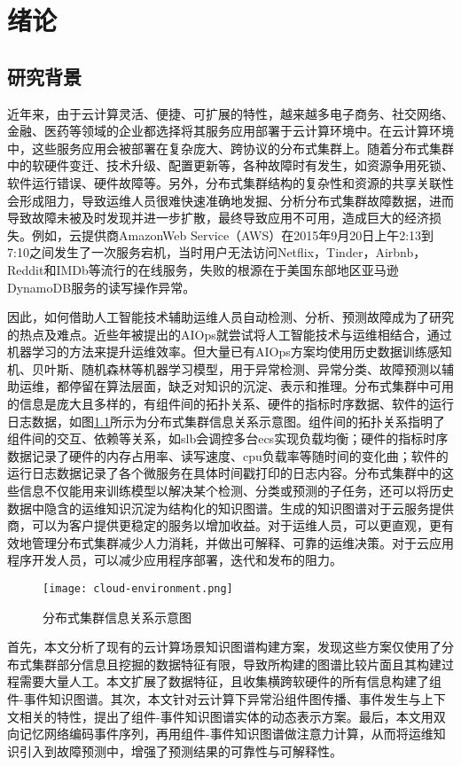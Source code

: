 \chapter{绪论}
\section{研究背景}
近年来，由于云计算灵活、便捷、可扩展的特性，越来越多电子商务、社交网络、金融、医药等领域的企业都选择将其服务应用部署于云计算环境中。在云计算环境中，这些服务应用会被部署在复杂庞大、跨协议的分布式集群上。随着分布式集群中的软硬件变迁、技术升级、配置更新等，各种故障时有发生，如资源争用死锁、软件运行错误、硬件故障等。另外，分布式集群结构的复杂性和资源的共享关联性会形成阻力，导致运维人员很难快速准确地发掘、分析分布式集群故障数据，进而导致故障未被及时发现并进一步扩散，最终导致应用不可用，造成巨大的经济损失。例如，云提供商AmazonWeb Service（AWS）在2015年9月20日上午2:13到7:10之间发生了一次服务宕机，当时用户无法访问Netflix，Tinder，Airbnb，Reddit和IMDb等流行的在线服务，失败的根源在于美国东部地区亚马逊DynamoDB服务的读写操作异常。

因此，如何借助人工智能技术辅助运维人员自动检测、分析、预测故障成为了研究的热点及难点。近些年被提出的AIOps就尝试将人工智能技术与运维相结合，通过机器学习的方法来提升运维效率。但大量已有AIOps方案均使用历史数据训练感知机、贝叶斯、随机森林等机器学习模型，用于异常检测、异常分类、故障预测以辅助运维，都停留在算法层面，缺乏对知识的沉淀、表示和推理。分布式集群中可用的信息是庞大且多样的，有组件间的拓扑关系、硬件的指标时序数据、软件的运行日志数据，如图\ref{cloud-environment}所示为分布式集群信息关系示意图。组件间的拓扑关系指明了组件间的交互、依赖等关系，如slb会调控多台ecs实现负载均衡；硬件的指标时序数据记录了硬件的内存占用率、读写速度、cpu负载率等随时间的变化曲；软件的运行日志数据记录了各个微服务在具体时间戳打印的日志内容。分布式集群中的这些信息不仅能用来训练模型以解决某个检测、分类或预测的子任务，还可以将历史数据中隐含的运维知识沉淀为结构化的知识图谱。生成的知识图谱对于云服务提供商，可以为客户提供更稳定的服务以增加收益。对于运维人员，可以更直观，更有效地管理分布式集群减少人力消耗，并做出可解释、可靠的运维决策。对于云应用程序开发人员，可以减少应用程序部署，迭代和发布的阻力。
\begin{figure}[htbp]
    \centering
    \texttt{[image: cloud-environment.png]}
    \caption{分布式集群信息关系示意图\label{cloud-environment}}
\end{figure}

首先，本文分析了现有的云计算场景知识图谱构建方案，发现这些方案仅使用了分布式集群部分信息且挖掘的数据特征有限，导致所构建的图谱比较片面且其构建过程需要大量人工。本文扩展了数据特征，且收集横跨软硬件的所有信息构建了组件-事件知识图谱。其次，本文针对云计算下异常沿组件图传播、事件发生与上下文相关的特性，提出了组件-事件知识图谱实体的动态表示方案。最后，本文用双向记忆网络编码事件序列，再用组件-事件知识图谱做注意力计算，从而将运维知识引入到故障预测中，增强了预测结果的可靠性与可解释性。


